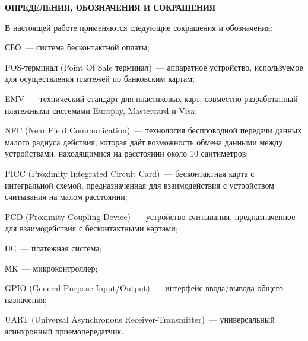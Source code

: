 \newpage

\begin{center}
	\textbf{ОПРЕДЕЛЕНИЯ, ОБОЗНАЧЕНИЯ И СОКРАЩЕНИЯ}
\end{center}

В настоящей работе применяются следующие сокращения и обозначения:

\begin{description}

	\item СБО~--- система бесконтактной оплаты;
	\item POS-терминал (Point Of Sale терминал)~--- аппаратное устройство, используемое для осуществления платежей по банковским картам;
	\item EMV~--- технический стандарт для пластиковых карт, совместно разработанный платежными системами Europay, Mastercard и Visa;
	\item NFC (Near Field Communication)~--- технология беспроводной передачи данных малого радиуса действия, которая даёт возможность обмена данными между устройствами, находящимися на расстоянии около 10 сантиметров;
	\item PICC (Proximity Integrated Circuit Card)~--- бесконтактная карта с интегральной схемой, предназначенная для взаимодействия с устройством считывания на малом расстоянии;
	\item PCD (Proximity Coupling Device)~--- устройство считывания, предназначенное для взаимодействия с бесконтактными картами;
	\item ПС~--- платежная система;

	\item МК~--- микроконтроллер;
	\item GPIO (General Purpose Input/Output)~--- интерфейс ввода/вывода общего назначения;
	\item UART (Universal Asynchronous Receiver-Transmitter)~--- универсальный асинхронный приемопередатчик.

\item \end{description}
